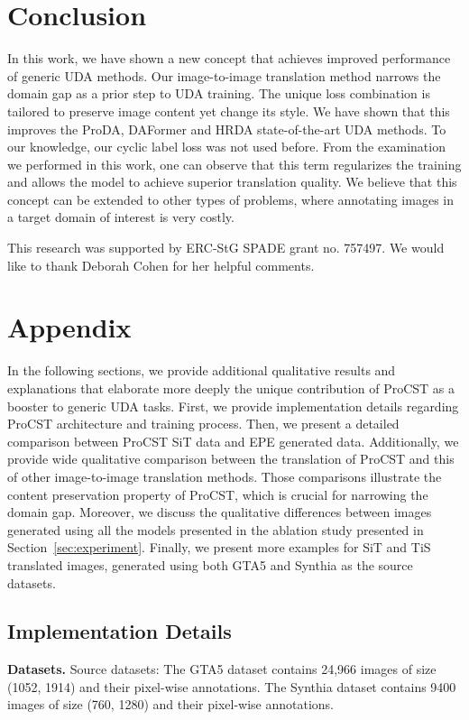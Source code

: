 \documentclass[letterpaper]{article} \usepackage[]{aaai23}  \usepackage{times}  \usepackage{helvet}  \usepackage{courier}  \usepackage[hyphens]{url}  \usepackage{graphicx} \urlstyle{rm} \def\UrlFont{\rm}  \usepackage{natbib}  \usepackage{caption} \frenchspacing  \setlength{\pdfpagewidth}{8.5in} \setlength{\pdfpageheight}{11in} \usepackage{algorithm}
\begin{document}
\section{Conclusion}
In this work, we have shown a new concept that achieves improved performance of generic UDA methods. Our image-to-image translation method narrows the domain gap as a prior step to UDA training. The unique loss combination is tailored to preserve image content yet change its style. We have shown that this improves the ProDA, DAFormer and HRDA state-of-the-art UDA methods. To our knowledge, our cyclic label loss was not used before. From the examination we performed in this work, one can observe that this term regularizes the training and allows the model to achieve superior translation quality. We believe that this concept can be extended to other types of problems, where annotating images in a target domain of interest is very costly.

 This research was supported by ERC-StG SPADE grant no. 757497. We would like to thank Deborah Cohen for her helpful comments.

\appendix
\section{Appendix}
In the following sections, we provide additional qualitative results and explanations that elaborate more deeply the unique contribution of ProCST as a booster to generic UDA tasks. 
First, we provide implementation details regarding ProCST architecture and training process. Then, we present a detailed comparison between ProCST SiT data and EPE \cite{richter2021enhancing} generated data. Additionally, we provide wide qualitative comparison between the translation of ProCST and this of other image-to-image translation methods. Those comparisons illustrate the content preservation property of ProCST, which is crucial for narrowing the domain gap. Moreover, we discuss the qualitative differences between images generated using all the models presented in the ablation study presented in Section~\ref{sec:experiment}. Finally, we present more examples for SiT and TiS translated images, generated using both GTA5 and Synthia as the source datasets.

\subsection{Implementation Details}

\textbf{Datasets.} Source datasets: The GTA5 dataset \cite{GTA5} contains 24,966 images of size (1052, 1914) and their pixel-wise annotations. The Synthia dataset contains 9400 images of size (760, 1280) and their pixel-wise annotations.
\end{document}
